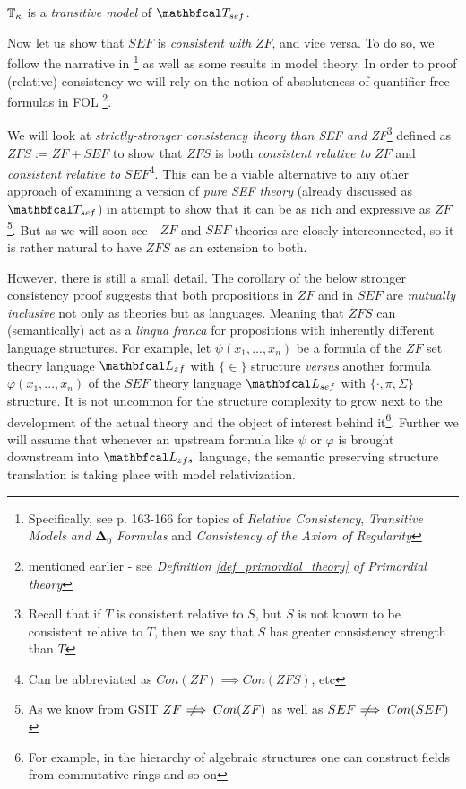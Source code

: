   




\begin{corollary}
  $\mathbb{T}_{\kappa}$ is a \textit{transitive model} of $\LsT_{sef}$.
\end{corollary}

Now let us show that $SEF$ is \textit{consistent with} $ZF$, and vice versa. To do so, we follow the narrative in \cite{jech2003set}\footnote{Specifically, see p. 163-166 for topics of \textit{Relative Consistency}, \textit{Transitive Models and $\boldsymbol{\Delta}_0$ Formulas} and \textit{Consistency of the Axiom of Regularity}} as well as some results in model theory\cite{marker2002model}. In order to proof (relative) consistency we will rely on the notion of absoluteness of quantifier-free formulas in FOL \footnote{mentioned earlier - see \textit{Definition \ref{def_primordial_theory} of Primordial theory}}.

We will look at \textit{strictly-stronger consistency theory than SEF and ZF}\footnote{Recall that if $T$ is consistent relative to $S$, but $S$ is not known to be consistent relative to $T$, then we say that $S$ has greater consistency strength than $T$} defined as $ZFS := ZF + SEF$ to show that $ZFS$ is both \textit{consistent relative to} $ZF$ and \textit{consistent relative to} $SEF$\footnote{Can be abbreviated as $Con(ZF) \implies Con(ZFS)$, etc}. This can be a viable alternative to any other approach of examining a version of \textit{pure SEF theory} (already discussed as $\LsT_{sef}$) in attempt to show that it can be as rich and expressive as $ZF$\footnote{As we know from GSIT $ZF \;\not\!\!\!\implies Con(ZF)$ as well as $SEF \;\not\!\!\!\implies Con(SEF)$}. But as we will soon see - $ZF$ and $SEF$ theories are closely interconnected, so it is rather natural to have $ZFS$ as an extension to both.
  
However, there is still a small detail. The corollary of the below stronger consistency proof suggests that both propositions in $ZF$ and in $SEF$ are \textit{mutually inclusive} not only as theories but as languages. Meaning that $ZFS$ can (semantically) act as a \textit{lingua franca} for propositions with inherently different language structures. For example, let $\psi(x_1, ..., x_n)$ be a formula of the $ZF$ set theory language $\lsign_{zf}$ with $\{\in\}$ structure \textit{versus} another formula $\varphi(x_1, ..., x_n)$ of the $SEF$ theory language $\lsign_{sef}$ with $\{\cdot, \pi, \Sigma\}$ structure. It is not uncommon for the structure complexity to grow next to the development of the actual theory and the object of interest behind it\footnote{For example, in the hierarchy of algebraic structures one can construct fields from commutative rings and so on}. Further we will assume that whenever an upstream formula like $\psi$ or $\varphi$ is brought downstream into $\lsign_{zfs}$ language, the semantic preserving structure translation is taking place with model relativization. 

